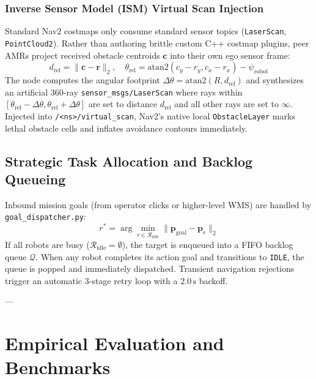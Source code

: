 \documentclass[10pt,twocolumn,a4paper]{article}
\theoremstyle{definition}
\begin{document}
\subsubsection{Inverse Sensor Model (ISM) Virtual Scan Injection}
Standard Nav2 costmaps only consume standard sensor topics (\texttt{LaserScan}, \texttt{PointCloud2}). Rather than authoring brittle custom C++ costmap plugins, peer AMRs project received obstacle centroids $\mathbf{c}$ into their own ego sensor frame:
\begin{equation}
    d_{\text{rel}} = \|\mathbf{c} - \mathbf{r}\|_2, \quad \theta_{\text{rel}} = \text{atan2}(c_y - r_y, c_x - r_x) - \psi_{\text{robot}}
\end{equation}
The node computes the angular footprint $\Delta \theta = \text{atan2}(R, d_{\text{rel}})$ and synthesizes an artificial 360-ray \texttt{sensor\_msgs/LaserScan} where rays within $[\theta_{\text{rel}} - \Delta\theta, \theta_{\text{rel}} + \Delta\theta]$ are set to distance $d_{\text{rel}}$ and all other rays are set to $\infty$. Injected into \texttt{/<ns>/virtual\_scan}, Nav2's native local \texttt{ObstacleLayer} marks lethal obstacle cells and inflates avoidance contours immediately.

\subsection{Strategic Task Allocation and Backlog Queueing}
Inbound mission goals (from operator clicks or higher-level WMS) are handled by \texttt{goal\_dispatcher.py}:
\begin{equation}
    r^* = \arg\min_{r \in \mathcal{R}_{\text{idle}}} \|\mathbf{p}_{\text{goal}} - \mathbf{p}_r\|_2
\end{equation}
If all robots are busy ($\mathcal{R}_{\text{idle}} = \emptyset$), the target is enqueued into a FIFO backlog queue $\mathcal{Q}$. When any robot completes its action goal and transitions to \texttt{IDLE}, the queue is popped and immediately dispatched. Transient navigation rejections trigger an automatic 3-stage retry loop with a $2.0\,\text{s}$ backoff.

---

\section{Empirical Evaluation and Benchmarks}
\end{document}
